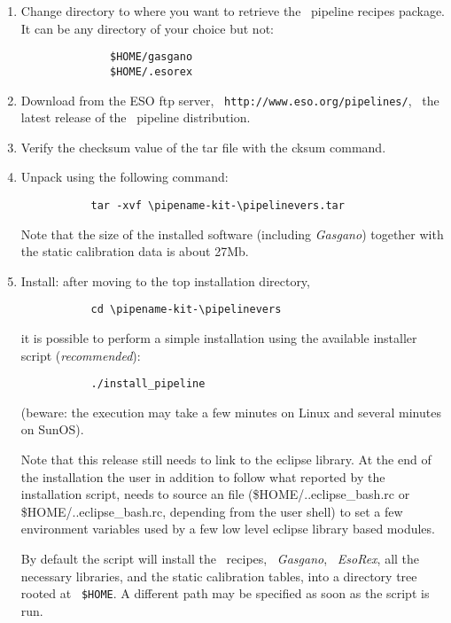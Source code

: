 \begin{enumerate}
\item Change directory to where you want to retrieve the \instname\, pipeline 
recipes \pipelinevers package. It can be any directory of your choice but not: 
\begin{verbatim}
              $HOME/gasgano 
              $HOME/.esorex
\end{verbatim}

\item Download from the ESO ftp server, 
\ \texttt{http://www.eso.org/pipelines/},
\ the latest release of the \instname\, pipeline distribution.

\item Verify the checksum value of the tar file with the cksum command. 

\item Unpack using the following command:
\begin{verbatim}
           tar -xvf \pipename-kit-\pipelinevers.tar
\end{verbatim}

Note that the size of the installed software (including {\it Gasgano}) 
together with the static calibration data is about 27Mb. 

\item Install: after moving to the top installation directory,
\begin{verbatim}
           cd \pipename-kit-\pipelinevers
\end{verbatim}

it is possible to perform a simple installation using the available 
installer script ({\it recommended}):
\begin{verbatim}
           ./install_pipeline
\end{verbatim}

(beware: the execution may take a few minutes on Linux and several minutes 
on SunOS).

Note that this release still needs to link to the eclipse library.
At the end of the installation the user in addition to follow what reported
by the installation script, needs to source an file 
(\$HOME/..eclipse\_bash.rc or \$HOME/..eclipse\_bash.rc, depending from the
user shell) to set a few environment variables used by a few
low level eclipse library based modules.

By default the script will install the \instname\, recipes, \ {\it Gasgano}, 
\ {\it EsoRex}, all the necessary libraries, and the static calibration 
tables, into a directory tree rooted at \ {\tt \$HOME}. A different path 
may be specified as soon as the script is run.


\end{enumerate}

